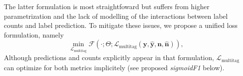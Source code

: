 The latter formulation is most straightfoward but suffers from higher parametrization and the lack of modelling of the interactions between label counts and label prediction. To mitigate these issues, we propose a unified loss formulation, namely
%
\begin{equation}
\underset{\mathcal{L}_{\text {multitag}}} {\min} \mathcal{F}\left(\cdot ; \Theta; \mathcal{L}_{\text {multitag}} (\mathbf{y}, \hat{\mathbf{y}}, \mathbf{n}, \hat{\mathbf{n}}) \right),
\end{equation}
%
Although predictions and counts explicitly appear in that formulation, \(\mathcal{L}_{\text {multitag}}\) can optimize for both metrics implicitely (see proposed \emph{sigmoidF1} below).






   \cite[p. 308-310]{statLearning}



